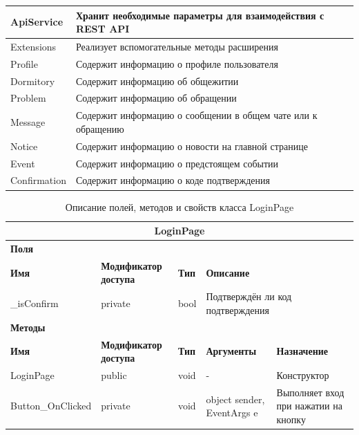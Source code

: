 \documentclass{../includes/TechDoc}
\begin{document}
\begin{table}[ht]
\begin{tabular}{ | l | p{12cm} | }
            ApiService & Хранит необходимые параметры для взаимодействия с REST API \\ \hline
            Extensions & Реализует вспомогательные методы расширения \\ \hline
            Profile & Содержит информацию о профиле пользователя \\ \hline
            Dormitory & Содержит информацию об общежитии \\ \hline
            Problem & Содержит информацию об обращении \\ \hline
            Message & Содержит информацию о сообщении в общем чате или к обращению \\ \hline
            Notice & Содержит информацию о новости на главной странице \\ \hline
            Event & Содержит информацию о предстоящем событии \\ \hline
            Confirmation & Содержит информацию о коде подтверждения \\ \hline
        \end{tabular}
    \end{table}

    \newpage



    \begin{table}[ht]
        \caption{\label{tab:class-loginpage-table}Описание полей, методов и свойств класса LoginPage}
        \centering
        \begin{tabular}{|l|p{3cm}|l|p{3cm}|p{5cm}|}
            \hline
            \multicolumn{5}{|c|}{LoginPage} \\ \hline
            \multicolumn{5}{|l|}{\textbf{Поля}} \\ \hline
            \textbf{Имя} & \textbf{Модификатор доступа} & \textbf{Тип} & \multicolumn{2}{l|}{\textbf{Описание}} \\ \hline
            \_isConfirm & private & bool & \multicolumn{2}{l|}{Подтверждён ли код подтверждения} \\ \hline
            \multicolumn{5}{|l|}{\textbf{Методы}} \\ \hline
            \textbf{Имя} & \textbf{Модификатор доступа} & \textbf{Тип} & \textbf{Аргументы} & \textbf{Назначение} \\ \hline
            LoginPage & public & void & - & Конструктор \\ \hline
            Button\_OnClicked & private & void & object sender, EventArgs e & Выполняет вход при нажатии на кнопку \\ \hline
        \end{tabular}
    \end{table}
\end{document}
